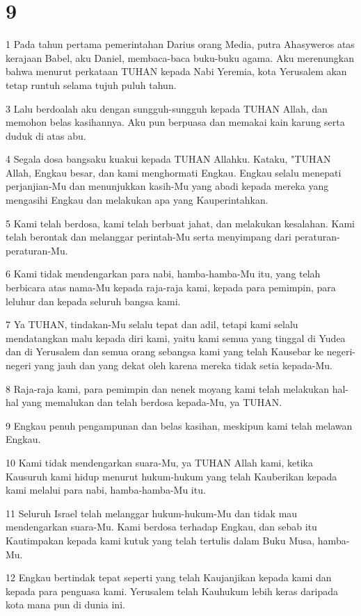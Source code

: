 \chapter{9}

\par 1 Pada tahun pertama pemerintahan Darius orang Media, putra Ahasyweros atas kerajaan Babel, aku Daniel, membaca-baca buku-buku agama. Aku merenungkan bahwa menurut perkataan TUHAN kepada Nabi Yeremia, kota Yerusalem akan tetap runtuh selama tujuh puluh tahun.
\par 3 Lalu berdoalah aku dengan sungguh-sungguh kepada TUHAN Allah, dan memohon belas kasihannya. Aku pun berpuasa dan memakai kain karung serta duduk di atas abu.
\par 4 Segala dosa bangsaku kuakui kepada TUHAN Allahku. Kataku, "TUHAN Allah, Engkau besar, dan kami menghormati Engkau. Engkau selalu menepati perjanjian-Mu dan menunjukkan kasih-Mu yang abadi kepada mereka yang mengasihi Engkau dan melakukan apa yang Kauperintahkan.
\par 5 Kami telah berdosa, kami telah berbuat jahat, dan melakukan kesalahan. Kami telah berontak dan melanggar perintah-Mu serta menyimpang dari peraturan-peraturan-Mu.
\par 6 Kami tidak mendengarkan para nabi, hamba-hamba-Mu itu, yang telah berbicara atas nama-Mu kepada raja-raja kami, kepada para pemimpin, para leluhur dan kepada seluruh bangsa kami.
\par 7 Ya TUHAN, tindakan-Mu selalu tepat dan adil, tetapi kami selalu mendatangkan malu kepada diri kami, yaitu kami semua yang tinggal di Yudea dan di Yerusalem dan semua orang sebangsa kami yang telah Kausebar ke negeri-negeri yang jauh dan yang dekat oleh karena mereka tidak setia kepada-Mu.
\par 8 Raja-raja kami, para pemimpin dan nenek moyang kami telah melakukan hal-hal yang memalukan dan telah berdosa kepada-Mu, ya TUHAN.
\par 9 Engkau penuh pengampunan dan belas kasihan, meskipun kami telah melawan Engkau.
\par 10 Kami tidak mendengarkan suara-Mu, ya TUHAN Allah kami, ketika Kausuruh kami hidup menurut hukum-hukum yang telah Kauberikan kepada kami melalui para nabi, hamba-hamba-Mu itu.
\par 11 Seluruh Israel telah melanggar hukum-hukum-Mu dan tidak mau mendengarkan suara-Mu. Kami berdosa terhadap Engkau, dan sebab itu Kautimpakan kepada kami kutuk yang telah tertulis dalam Buku Musa, hamba-Mu.
\par 12 Engkau bertindak tepat seperti yang telah Kaujanjikan kepada kami dan kepada para penguasa kami. Yerusalem telah Kauhukum lebih keras daripada kota mana pun di dunia ini.
